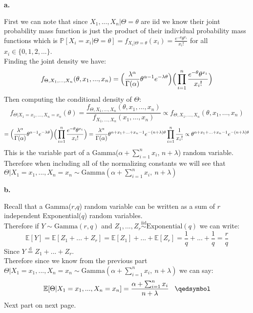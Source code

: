 \documentclass{article}
\begin{document}
{\Large\textbf{a.}}
\begin{center}
\doublespacing
    First we can note that since $X_1, ..., X_n |\Theta =\theta$ are iid we know their joint probability mass function is just the product of their individual probability mass functions which is $\mathbb{P}[X_i = x_i |\Theta =\theta] = f_{X_i |\Theta =\theta} (x_i) =\frac{e^{-\theta}\theta^{x_i}}{x_i!}$ for all $x_i\in\{0, 1, 2, ...\}$.
    \\Finding the joint density we have:
    \[f_{\Theta, X_1, ..., X_n} (\theta, x_1, ..., x_n) =\Big{(}\frac{\lambda^\alpha}{\Gamma (\alpha)}\theta^{\alpha - 1} e^{-\lambda\theta}\Big{)}\Big{(}\prod_{i=1}^n\frac{e^{-\theta}\theta^{x_i}}{x_i!}\Big{)}\]
    Then computing the conditional density of $\Theta$:
    \[f_{\Theta |X_1 = x_1, ..., X_n = x_n} (\theta) =\frac{f_{\Theta, X_1, ..., X_n} (\theta, x_1, ..., x_n)}{f_{X_1, ..., X_n} (x_1, ..., x_n)}\propto f_{\Theta, X_1, ..., X_n} (\theta, x_1, ..., x_n)\]
    \[=\Big{(}\frac{\lambda^\alpha}{\Gamma (\alpha)}\theta^{\alpha - 1} e^{-\lambda\theta}\Big{)}\Big{(}\prod_{i=1}^n\frac{e^{-\theta}\theta^{x_i}}{x_i!}\Big{)} =\frac{\lambda^\alpha}{\Gamma (\alpha)}\theta^{\alpha + x_1 + ... + x_n - 1} e^{-(n +\lambda)\theta}\prod_{i=1}^n\frac{1}{x_i!}\propto\theta^{\alpha + x_1 + ... + x_n - 1} e^{-(n +\lambda)\theta}\]
    This is the variable part of a Gamma($\alpha +\sum_{i=1}^n x_i$, $n+\lambda$) random variable.
    \\Therefore when including all of the normalizing constants we will see that $\Theta | X_1 = x_1, ..., X_n = x_n\sim\mbox{Gamma}(\alpha +\sum_{i=1}^n x_i,\:n+\lambda)$ \qedsymbol
\end{center}

{\Large\textbf{b.}}
\begin{center}
\doublespacing
    Recall that a Gamma($r$,$q$) random variable can be written as a sum of $r$ independent Exponential($q$) random variables.
    \\Therefore if $Y\sim\mbox{Gamma}(r,q)$ and $Z_1, ..., Z_r\overset{\mbox{iid}}{\sim}\mbox{Exponential}(q)$ we can write:
    \[\mathbb{E}[Y] =\mathbb{E}[Z_1 + ... + Z_r] =\mathbb{E}[Z_1] + ... +\mathbb{E}[Z_r] =\frac{1}{q} + ... +\frac{1}{q} =\frac{r}{q}\]
    Since $Y\overset{\mbox{d}}{=} Z_1 + ... + Z_r$.
    \\Therefore since we know from the previous part $\Theta | X_1 = x_1, ..., X_n = x_n\sim\mbox{Gamma}(\alpha +\sum_{i=1}^n x_i,\:n+\lambda)$ we can say:
    \[\mathbb{E}[\Theta | X_1 = x_1, ..., X_n = x_n] =\frac{\alpha +\sum_{i=1}^n x_i}{n +\lambda}\;\;\;\qedsymbol\]
    Next part on next page.
\end{center}
\end{document}
